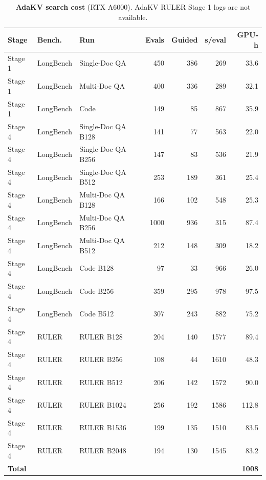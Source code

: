\begin{table}[t]
  \centering
  \scriptsize
  \setlength{\tabcolsep}{2.5pt}
  \begin{tabular}{@{}l l l r r r r@{}}
    \toprule
    Stage & Bench. & Run & Evals & Guided & s/eval & GPU-h \\
    \midrule
    Stage 1 & LongBench & Single-Doc QA & 450 & 386 & 269 & 33.6 \\
    Stage 1 & LongBench & Multi-Doc QA & 400 & 336 & 289 & 32.1 \\
    Stage 1 & LongBench & Code & 149 & 85 & 867 & 35.9 \\
    Stage 4 & LongBench & Single-Doc QA B128 & 141 & 77 & 563 & 22.0 \\
    Stage 4 & LongBench & Single-Doc QA B256 & 147 & 83 & 536 & 21.9 \\
    Stage 4 & LongBench & Single-Doc QA B512 & 253 & 189 & 361 & 25.4 \\
    Stage 4 & LongBench & Multi-Doc QA B128 & 166 & 102 & 548 & 25.3 \\
    Stage 4 & LongBench & Multi-Doc QA B256 & 1000 & 936 & 315 & 87.4 \\
    Stage 4 & LongBench & Multi-Doc QA B512 & 212 & 148 & 309 & 18.2 \\
    Stage 4 & LongBench & Code B128 & 97 & 33 & 966 & 26.0 \\
    Stage 4 & LongBench & Code B256 & 359 & 295 & 978 & 97.5 \\
    Stage 4 & LongBench & Code B512 & 307 & 243 & 882 & 75.2 \\
    Stage 4 & RULER & RULER B128 & 204 & 140 & 1577 & 89.4 \\
    Stage 4 & RULER & RULER B256 & 108 & 44 & 1610 & 48.3 \\
    Stage 4 & RULER & RULER B512 & 206 & 142 & 1572 & 90.0 \\
    Stage 4 & RULER & RULER B1024 & 256 & 192 & 1586 & 112.8 \\
    Stage 4 & RULER & RULER B1536 & 199 & 135 & 1510 & 83.5 \\
    Stage 4 & RULER & RULER B2048 & 194 & 130 & 1545 & 83.2 \\
    \textbf{Total} &  &  &  &  &  & \textbf{1008} \\
    \bottomrule
  \end{tabular}
  \caption{\textbf{AdaKV search cost} (RTX A6000). AdaKV RULER Stage 1 logs are not available.}
  \label{tab:app-cost-adakv}
\end{table}


